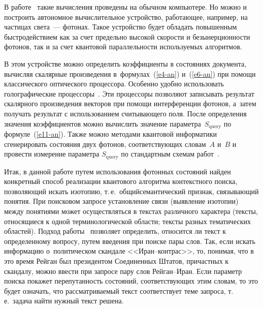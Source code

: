\begin{multicols}{2}
    В работе~\cite{6-an} такие вычисления проведены на обычном 
компьютере. Но можно и по\-стро\-ить автономное вы\-чис\-ли\-тель\-ное устройство, 
работающее, например, на час\-ти\-цах света~--- фотонах. Такое устройство будет 
обладать повышенным быст\-ро\-дей\-ст\-ви\-ем как за счет предельно высокой 
ско\-рости и безынер\-ци\-он\-ности фотонов, так и за счет кван\-то\-вой па\-рал\-лель\-ности 
ис\-поль\-зу\-емых алгоритмов.
    
    В этом устройстве можно определить коэффициенты в состояниях 
документа, вычисляя скалярные произведения  
в~формулах~(\ref{e4-an}) и~(\ref{e6-an}) при помощи классического оптического 
процессора. Особенно удоб\-но использовать голографические 
процессоры~\cite{7-an, 8-an}. Эти процессоры позволяют записывать результат 
скалярного произведения векторов при помощи интерференции фотонов, 
а~затем получать результат с использованием счи\-ты\-ва\-юще\-го поля. После 
определения значения коэффициентов можно вы\-чис\-лить значение па\-ра\-мет\-ра~$S_{\mathrm{query}}$ 
по формуле~(\ref{e11-an}). Так\-же мож\-но методами квантовой 
информатики сгенерировать состояния двух фотонов, со\-от\-вет\-ст\-ву\-ющих 
словам~$A$ и~$B$ и провести измерение па\-ра\-мет\-ра $S_{\mathrm{query}}$ по 
стандартным схемам работ~\cite{9-an, 10-an, 11-an}. 
    
    Итак, в данной работе путем использования фотонных со\-сто\-яний найден 
конкретный способ реализации квантового алгоритма контекстного поиска, 
позволяющий искать изотопию, т.\,е.\ общий\linebreak семантический признак, 
свя\-зы\-ва\-ющий понятия. При поисковом запросе установление связи (выявление 
изотопии) меж\-ду понятиями может осуществляться в текстах различного 
характера (текс\-ты, относящиеся к одной терминологической об\-ласти; текс\-ты 
раз\-ных тематических областей). Подход работы~\cite{6-an} позволяет 
определить, относится ли текст к определенному вопросу, путем введения при 
поиске пары слов. Так, если искать информацию о~политическом скандале  
<<Иран--конт\-рас>>, то, понимая, что в это время Рейган был президентом 
Соединенных Штатов, причастных к скандалу, можно ввести при запросе пару 
слов Рей\-ган--Иран. Если параметр поиска покажет перепутанность со\-сто\-яний, 
соответствующих этим словам, то это будет означать, что рас\-смат\-ри\-ва\-емый 
текст соответствует теме запроса, т.\,е.\ задача найти нуж\-ный текст решена.
    

\end{multicols}
